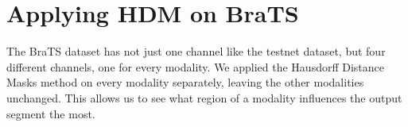 \section{Applying HDM on BraTS}

The BraTS dataset has not just one channel like the testnet dataset, but four different channels, one for every modality. We applied the Hausdorff Distance Masks method on every modality
separately, leaving the other modalities unchanged. This allows us to see what region of a modality influences the output segment the most.